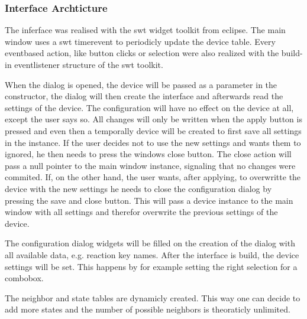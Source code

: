 \subsubsection{Interface Archticture}
The inferface was realised with the swt widget toolkit from eclipse. %
The main window uses a swt timerevent to periodicly update the device table. Every eventbased action, like button clicks or selection were also realized with the build-in eventlistener structure of the swt toolkit. %

When the dialog is opened, the device will be passed as a parameter in the constructor, the dialog will then create the interface and afterwards read the settings of the device. 
The configuration will have no effect on the device at all, except the user says so. All changes will only be written when the apply button is pressed and even then a temporally device will be created to first save all settings in the instance. If the user decides not to use the new settings and wants them to ignored, he then needs to press the windows close button. The close action will pass a null pointer to the main window instance, signaling that no changes were commited.
If, on the other hand, the user wants, after applying, to overwritte the device with the new settings he needs to close the configuration dialog by pressing the save and close button. This will pass a device instance to the main window with all settings and therefor overwrite the previous settings of the device.

The configuration dialog widgets will be filled on the creation of the dialog with all available data, e.g. reaction key names. After the interface is build, the device settings will be set. This happens by for example setting the right selection for a combobox.

The neighbor and state tables are dynamicly created. This way one can decide to add more states and the number of possible neighbors is theoraticly unlimited.


